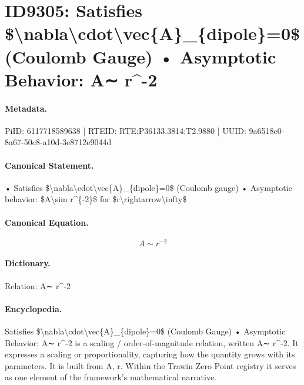 \section*{ID9305: Satisfies \$\textbackslash{}nabla\textbackslash{}cdot\textbackslash{}vec\{A\}\_\{dipole\}=0\$ (Coulomb Gauge) • Asymptotic Behavior: A∼ r\textasciicircum{}-2}
\paragraph{Metadata.}
PiID: 6117718589638 | RTEID: RTE:P36133.3814:T2.9880 | UUID: 9a6518c0-8a67-50c8-a10d-3e8712e9044d

\paragraph{Canonical Statement.}
• Satisfies \$\textbackslash{}nabla\textbackslash{}cdot\textbackslash{}vec\{A\}\_\{dipole\}=0\$ (Coulomb gauge) • Asymptotic behavior: \$A\textbackslash{}sim r\textasciicircum{}\{-2\}\$ for \$r\textbackslash{}rightarrow\textbackslash{}infty\$

\paragraph{Canonical Equation.}
\[
A\sim r^{-2}
\]

\paragraph{Dictionary.}
Relation: A∼ r\textasciicircum{}-2

\paragraph{Encyclopedia.}
Satisfies \$\textbackslash{}nabla\textbackslash{}cdot\textbackslash{}vec\{A\}\_\{dipole\}=0\$ (Coulomb Gauge) • Asymptotic Behavior: A∼ r\textasciicircum{}-2 is a scaling / order-of-magnitude relation, written A∼ r\textasciicircum{}-2. It expresses a scaling or proportionality, capturing how the quantity grows with its parameters. It is built from A, r. Within the Trawin Zero Point registry it serves as one element of the framework's mathematical narrative.
